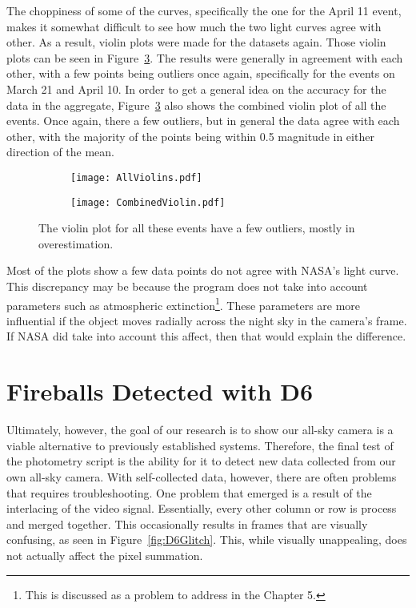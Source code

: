 The choppiness of some of the curves, specifically the one for the April 11 event, makes it somewhat difficult to see how much the two light curves agree with other. As a result, violin plots were made for the datasets again. Those violin plots can be seen in Figure~\ref{fig:twoviolin}. The results were generally in agreement with each other, with a few points being outliers once again, specifically for the events on March 21 and April 10. In order to get a general idea on the accuracy for the data in the aggregate, Figure~\ref{fig:twoviolin} also shows the combined violin plot of all the events. Once again, there a few outliers, but in general the data agree with each other, with the majority of the points being within 0.5 magnitude in either direction of the mean.

\begin{figure}[h!]
\centering
\begin{subfigure}{.5\textwidth}
	\centering
	\texttt{[image: AllViolins.pdf]}
	\label{fig:AllViolins}
\end{subfigure}%
\begin{subfigure}{.5\textwidth}
	\centering
	\texttt{[image: CombinedViolin.pdf]}
	\label{fig:CombinedViolin}
\end{subfigure}
\caption{The violin plot for all these events have a few outliers, mostly in overestimation.}
\label{fig:twoviolin}
\end{figure}

Most of the plots show a few data points do not agree with NASA's light curve. This discrepancy may be because the program does not take into account parameters such as atmospheric extinction\footnote{This is discussed as a problem to address in the Chapter 5.}. These parameters are more influential if the object moves radially across the night sky in the camera's frame. If NASA did take into account this affect, then that would explain the difference. 


\section{Fireballs Detected with D6}

Ultimately, however, the goal of our research is to show our all-sky camera is a viable alternative to previously established systems. Therefore, the final test of the photometry script is the ability for it to detect new data collected from our own all-sky camera. With self-collected data, however, there are often problems that requires troubleshooting. One problem that emerged is a result of the interlacing of the video signal. Essentially, every other column or row is process and merged together. This occasionally results in frames that are visually confusing, as seen in Figure~\ref{fig:D6Glitch}. This, while visually unappealing, does not actually affect the pixel summation.

